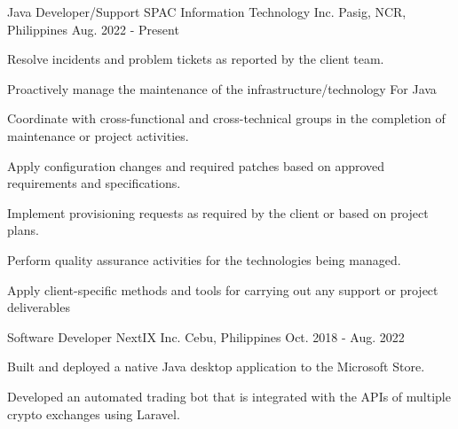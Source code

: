 

\begin{cventries}

  \cventry
  {Java Developer/Support} %
  {SPAC Information Technology Inc.} %
  {Pasig, NCR, Philippines} %
  {Aug. 2022 - Present} %
  {
    \begin{cvitems} %
      \item {Resolve incidents and problem tickets as reported by the client team.}
      \item {Proactively manage the maintenance of the infrastructure/technology For Java}
      \item {Coordinate with cross-functional and cross-technical groups in the completion of maintenance or project activities.}
      \item {Apply configuration changes and required patches based on approved
      requirements and specifications.}
      \item {Implement provisioning requests as required by the client or based on
      project plans.}
      \item {Perform quality assurance activities for the technologies being managed.}
      \item {Apply client-specific methods and tools for carrying out any support or
      project deliverables \\}
    \end{cvitems}
  }
  \cventry
    {Software Developer} %
    {NextIX Inc.} %
    {Cebu, Philippines} %
    {Oct. 2018 - Aug. 2022} %
    {
      \begin{cvitems} %
        \item {Built and deployed a native Java desktop application to the Microsoft Store.}
        \item {Developed an automated trading bot that is integrated with the APIs of multiple crypto exchanges using Laravel.}

\end{cvitems}}
\end{cventries}
